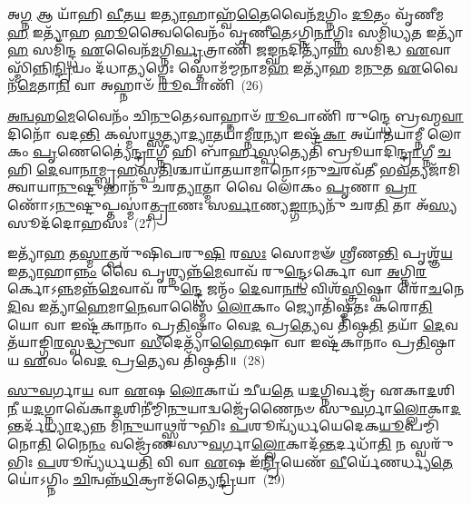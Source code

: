 {\anuvakamend[{\-\ul{𑌬𑍍𑌰}\-\-\ul{𑌹𑍍𑌮}\-\-\ul{𑌵𑌾}\-𑌦𑌿\-\ul{𑌨𑍋} 𑌵𑍍𑌯᳴𑌨𑍍𑌯𑌾\-\ul{𑌦𑍇}\-𑌷𑍁 𑌯𑌜᳴𑌮𑌾\-\ul{𑌨}\-𑌸𑍍𑌤𑍍𑌰𑍀𑌣𑌿᳴ 𑌚}]}%

𑌅\-\ul{𑌗𑍍𑌨} 𑌆 𑌯𑌾᳴𑌹𑌿 \ul{𑌵𑍀}\-𑌤\-\ul{𑌯} 𑌇\-\ul{𑌤𑍍𑌯𑌾}\-𑌹𑌾𑌹𑍍𑌵᳴\-\ul{𑌤𑍈}\-𑌵𑍈𑌨᳴\-\ul{𑌮}\-𑌗𑍍𑌨𑌿𑌂 \ul{𑌦𑍂}\-𑌤𑌂 𑌵𑍃᳴𑌣𑍀𑌮\-\ul{𑌹} 𑌇𑌤𑍍𑌯𑌾᳴𑌹 \ul{𑌹𑍂}\-𑌤𑍍𑌵𑍈𑌵𑍈𑌨𑌂᳴ 𑌵𑍃𑌣𑍀\-\ul{𑌤𑍇}\-\-𑌽𑌗𑍍𑌨𑌿\-\ul{𑌨𑌾}\-𑌗𑍍𑌨𑌿𑌃 𑌸𑌮𑌿᳴𑌧𑍍𑌯\-\ul{𑌤} 𑌇𑌤𑍍𑌯𑌾᳴\-\ul{𑌹} 𑌸𑌮𑌿᳴𑌨𑍍𑌦𑍍𑌧 \ul{𑌏}\-𑌵𑍈𑌨᳴\-\ul{𑌮}\-𑌗𑍍𑌨𑌿\-\ul{𑌰𑍍𑌵𑍃}\-𑌤𑍍𑌰𑌾𑌣𑌿᳴ 𑌜𑌙𑍍𑌘\-\ul{𑌨}\-𑌦𑌿𑌤𑍍𑌯𑌾᳴\-\ul{𑌹} 𑌸𑌮𑌿᳴𑌦𑍍𑌧 \ul{𑌏}\-𑌵𑌾𑌸𑍍𑌮𑌿᳴𑌨𑍍𑌨𑌿\-\ul{𑌨𑍍𑌦𑍍𑌰𑌿}\-𑌯𑌂 𑌦᳴𑌧𑌾\-\ul{𑌤𑍍𑌯}\-𑌗𑍍𑌨𑍇𑌃 𑌸𑍍𑌤𑍋𑌮᳴𑌮𑍍𑌮𑌨𑌾𑌮\-\ul{𑌹} 𑌇𑌤𑍍𑌯𑌾᳴𑌹 𑌮\-\ul{𑌨𑍁}\-𑌤 \ul{𑌏}\-𑌵𑍈𑌨᳴\-\ul{𑌮𑍇}\-𑌤𑌾\-\ul{𑌨𑌿} 𑌵𑌾 𑌅𑌹𑍍𑌨𑌾𑍞᳴ \ul{𑌰𑍂}\-𑌪𑌾𑌣𑌿᳴~(26)

\-\ul{𑌅}\-\-\ul{𑌨𑍍𑌵}\-𑌹\-\ul{𑌮𑍇}\-𑌵𑍈𑌨𑌂᳴ 𑌚𑌿\-\ul{𑌨𑍁}\-𑌤𑍇\-𑌽𑌵𑌾𑌹𑍍𑌨𑌾𑍞᳴ \ul{𑌰𑍂}\-𑌪𑌾𑌣𑌿᳴ 𑌰𑍁𑌨𑍍𑌦𑍍𑌧𑍇 𑌬𑍍𑌰𑌹𑍍𑌮\-\ul{𑌵𑌾}\-𑌦𑌿𑌨𑍋᳴ 𑌵𑌦\-\ul{𑌨𑍍𑌤𑌿} 𑌕𑌸𑍍𑌮𑌾॑\-\ul{𑌥𑍍𑌸}\-𑌤𑍍𑌯𑌾\-\ul{𑌦𑍍𑌯𑌾}\-𑌤𑌯𑌾॑𑌮𑍍𑌨𑍀\-\ul{𑌰}\-𑌨𑍍𑌯𑌾 𑌇𑌷𑍍𑌟᳴\-\ul{𑌕𑌾} 𑌅𑌯𑌾᳴𑌤𑌯𑌾𑌮𑍍𑌨𑍀 𑌲𑍋𑌕𑌂 \ul{𑌪𑍃}\-𑌣𑍇𑌤𑍍𑌯𑍈॑\-\ul{𑌨𑍍𑌦𑍍𑌰𑌾}\-𑌗𑍍𑌨𑍀 𑌹𑌿 𑌬𑌾᳴𑌰𑍍\mbox{}𑌹\-\ul{𑌸𑍍𑌪}\-𑌤𑍍𑌯𑍇𑌤𑌿᳴ 𑌬𑍍𑌰𑍂𑌯𑌾𑌦𑌿\-\ul{𑌨𑍍𑌦𑍍𑌰𑌾}\-𑌗𑍍𑌨𑍀 \ul{𑌚} 𑌹𑌿 \ul{𑌦𑍇}\-𑌵𑌾\-\ul{𑌨𑌾}\-𑌮𑍍𑌬𑍃\-\ul{𑌹}\-𑌸𑍍𑌪\-\ul{𑌤𑌿}\-𑌶𑍍𑌚𑌾𑌯𑌾᳴𑌤𑌯𑌾𑌮𑌾𑌨𑍋\-𑌽𑌨𑍁\-\ul{𑌚}\-𑌰𑌵᳴𑌤𑍀 𑌭\-\ul{𑌵}\-𑌤𑍍𑌯𑌜𑌾᳴𑌮𑌿𑌤𑍍𑌵𑌾𑌯𑌾\-\ul{𑌨𑍁}\-𑌷𑍍𑌟𑍁𑌭𑌾𑌨𑍁᳴ 𑌚𑌰\-\ul{𑌤𑍍𑌯𑌾}\-𑌤𑍍𑌮𑌾 𑌵𑍈 𑌲𑍋᳴𑌕𑌂 \ul{𑌪𑍃}\-𑌣𑌾 \ul{𑌪𑍍𑌰𑌾}\-𑌣𑍋᳴\-𑌽\-\ul{𑌨𑍁}\-𑌷𑍍𑌟𑍁𑌪𑍍𑌤𑌸𑍍𑌮𑌾॑\-\ul{𑌤𑍍𑌪𑍍𑌰𑌾}\-𑌣𑌃 𑌸\-\ul{𑌰𑍍𑌵𑌾}\-𑌣𑍍𑌯\-\ul{𑌙𑍍𑌗𑌾}\-𑌨𑍍𑌯𑌨𑍁᳴ 𑌚𑌰\-\ul{𑌤𑌿} 𑌤𑌾 𑌅᳴\-\ul{𑌸𑍍𑌯} 𑌸𑍂𑌦᳴𑌦𑍋𑌹𑌸𑌃~(27)

𑌇𑌤𑍍𑌯𑌾᳴\-\ul{𑌹} 𑌤\-\ul{𑌸𑍍𑌮𑌾}\-𑌤𑍍𑌪𑌰𑍁᳴𑌷𑌿𑌪𑌰𑍁\-\ul{𑌷𑌿} 𑌰\-\ul{𑌸𑌃} 𑌸𑍋𑌮𑍟᳴ 𑌶𑍍𑌰𑍀𑌣\-\ul{𑌨𑍍𑌤𑌿} 𑌪𑍃𑌶𑍍𑌞᳴\-\ul{𑌯} 𑌇\-\ul{𑌤𑍍𑌯𑌾}\-𑌹𑌾\-\ul{𑌨𑍍𑌨𑌂} 𑌵𑍈 𑌪𑍃𑌶𑍍𑌨𑍍𑌯𑌨𑍍𑌨᳴\-\ul{𑌮𑍇}\-𑌵𑌾𑌵᳴ 𑌰𑍁\-\ul{𑌨𑍍𑌦𑍍𑌧𑍇}\-\-𑌽𑌰𑍍𑌕𑍋 𑌵𑌾 \ul{𑌅}\-𑌗𑍍𑌨𑌿\-\ul{𑌰}\-𑌰𑍍𑌕𑍋\-𑌽\-\ul{𑌨𑍍𑌨}\-𑌮𑌨𑍍𑌨᳴\-\ul{𑌮𑍇}\-𑌵𑌾𑌵᳴ 𑌰𑍁\-\ul{𑌨𑍍𑌦𑍍𑌧𑍇} 𑌜𑌨𑍍𑌮𑌂᳴ \ul{𑌦𑍇}\-𑌵𑌾\-\ul{𑌨𑌾𑌂} 𑌵𑌿𑌶᳴\-\ul{𑌸𑍍𑌤𑍍𑌰𑌿}\-𑌷𑍍𑌵𑌾 𑌰𑍋᳴\-\ul{𑌚}\-𑌨𑍇 \ul{𑌦𑌿}\-𑌵 𑌇𑌤𑍍𑌯𑌾᳴\-\ul{𑌹𑍇}\-𑌮𑌾\-\ul{𑌨𑍇}\-𑌵𑌾𑌸𑍍𑌮𑍈᳴ \ul{𑌲𑍋}\-𑌕𑌾𑌂 𑌜𑍍𑌯𑍋𑌤𑌿᳴𑌷𑍍𑌮𑌤𑌃 𑌕𑌰𑍋\-\ul{𑌤𑌿} 𑌯𑍋 𑌵𑌾 𑌇𑌷𑍍𑌟᳴𑌕𑌾𑌨𑌾𑌂 𑌪𑍍𑌰\-\ul{𑌤𑌿}\-𑌷𑍍𑌠𑌾𑌂 𑌵𑍇\-\ul{𑌦} 𑌪𑍍𑌰\-\ul{𑌤𑍍𑌯𑍇}\-𑌵 𑌤𑌿᳴𑌷𑍍𑌠\-\ul{𑌤𑌿} 𑌤𑌯𑌾᳴ \ul{𑌦𑍇}\-𑌵𑌤᳴𑌯𑌾𑌙𑍍𑌗𑌿\-\ul{𑌰}\-𑌸𑍍𑌵\-\ul{𑌦𑍍𑌧𑍍𑌰𑍁}\-𑌵𑌾 \ul{𑌸𑍀}\-𑌦𑍇𑌤𑍍𑌯𑌾᳴\-\ul{𑌹𑍈}\-𑌷𑌾 𑌵𑌾 𑌇𑌷𑍍𑌟᳴𑌕𑌾𑌨𑌾𑌂 𑌪𑍍𑌰\-\ul{𑌤𑌿}\-𑌷𑍍𑌠𑌾 𑌯 \ul{𑌏}\-𑌵𑌂 𑌵𑍇\-\ul{𑌦} 𑌪𑍍𑌰\-\ul{𑌤𑍍𑌯𑍇}\-𑌵 𑌤𑌿᳴𑌷𑍍𑌠𑌤𑌿॥~(28)

{\anuvakamend[{\-\ul{𑌰𑍂}\-𑌪𑌾\-\ul{𑌣𑌿} 𑌸𑍂𑌦᳴𑌦𑍋𑌹\-\ul{𑌸}\-𑌸𑍍𑌤\-\ul{𑌯𑌾} 𑌷𑍋𑌡᳴𑌶 𑌚}]}%

\-\ul{𑌸𑍁}\-\-\ul{𑌵}\-𑌰𑍍𑌗𑌾\-\ul{𑌯} 𑌵𑌾 \ul{𑌏}\-𑌷 \ul{𑌲𑍋}\-𑌕𑌾𑌯᳴ 𑌚𑍀𑌯\-\ul{𑌤𑍇} 𑌯\-\ul{𑌦}\-𑌗𑍍𑌨𑌿𑌰𑍍𑌵𑌜𑍍𑌰᳴ 𑌏𑌕𑌾\-\ul{𑌦}\-𑌶𑌿\-\ul{𑌨𑍀} 𑌯\-\ul{𑌦}\-𑌗𑍍𑌨𑌾𑌵𑍇᳴𑌕𑌾\-\ul{𑌦}\-𑌶𑌿𑌨𑍀॑𑌮𑍍𑌮𑌿\-\ul{𑌨𑍁}\-𑌯𑌾𑌦𑍍𑌵𑌜𑍍𑌰𑍇᳴𑌣𑍈𑌨𑍞 𑌸𑍁\-\ul{𑌵}\-𑌰𑍍𑌗𑌾\-\ul{𑌲𑍍𑌲𑍋}\-𑌕𑌾\-\-\ul{𑌦}\-𑌨𑍍𑌤𑌰𑍍𑌦᳴\-\ul{𑌧𑍍𑌯𑌾}\-𑌦𑍍𑌯𑌨𑍍𑌨 𑌮𑌿᳴\-\ul{𑌨𑍁}\-𑌯𑌾𑌥𑍍𑌸𑍍𑌵𑌰𑍁᳴𑌭𑌿𑌃 \ul{𑌪}\-𑌶𑍂𑌨𑍍𑌵𑍍𑌯᳴𑌰𑍍𑌧𑌯𑍇𑌦𑍇𑌕\-\ul{𑌯𑍂}\-𑌪𑌮𑍍𑌮𑌿᳴𑌨𑍋\-\ul{𑌤𑌿} 𑌨𑍈\-\ul{𑌨𑌂} 𑌵𑌜𑍍𑌰𑍇᳴𑌣 𑌸𑍁\-\ul{𑌵}\-𑌰𑍍𑌗𑌾\-\ul{𑌲𑍍𑌲𑍋}\-𑌕𑌾𑌦᳴\-\ul{𑌨𑍍𑌤}\-𑌰𑍍𑌦𑌧𑌾᳴\-\ul{𑌤𑌿} 𑌨 𑌸𑍍𑌵𑌰𑍁᳴𑌭𑌿𑌃 \ul{𑌪}\-𑌶𑍂𑌨𑍍𑌵𑍍𑌯᳴𑌰𑍍𑌧𑌯\-\ul{𑌤𑌿} 𑌵𑌿 𑌵𑌾 \ul{𑌏}\-𑌷 𑌇᳴\-\ul{𑌨𑍍𑌦𑍍𑌰𑌿}\-𑌯𑍇𑌣᳴ \ul{𑌵𑍀}\-𑌰𑍍𑌯𑍇᳴𑌣𑌰𑍍𑌧𑍍𑌯\-\ul{𑌤𑍇} 𑌯𑍋॑\-𑌽𑌗𑍍𑌨𑌿𑌂 \ul{𑌚𑌿}\-𑌨𑍍𑌵𑌨𑍍𑌨᳴\-\ul{𑌧𑌿}\-𑌕𑍍𑌰𑌾𑌮᳴𑌤𑍍𑌯𑍈\-\ul{𑌨𑍍𑌦𑍍𑌰𑌿}\-𑌯𑌾~(29)

